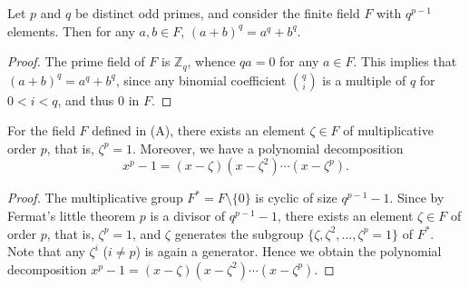 \begin{theorem}[A]
  \label{fact_A}
  \leanok
  Let $p$ and $q$ be distinct odd primes, and consider the finite field $F$ with $q^{p-1}$ elements. Then for any $a, b \in F$, $(a + b)^q = a^q + b^q$.
\end{theorem}
\begin{proof}
  The prime field of $F$ is $\mathbb{Z}_q$, whence $qa = 0$ for any $a \in F$. This implies that $(a + b)^q = a^q + b^q$, since any binomial coefficient $\binom{q}{i}$ is a multiple of $q$ for $0 < i < q$, and thus 0 in $F$.
\end{proof}

\begin{theorem}[B]
  \label{fact_B}
  \leanok
  For the field $F$ defined in (A), there exists an element $\zeta \in F$ of multiplicative order $p$, that is, $\zeta^p = 1$. Moreover, we have a polynomial decomposition
  \[
  x^p - 1 = (x - \zeta) (x - \zeta^2) \cdots (x - \zeta^p).
  \]
\end{theorem}
\begin{proof}
  The multiplicative group $F^* = F \setminus \{0\}$ is cyclic of size $q^{p-1} - 1$. Since by Fermat's little theorem $p$ is a divisor of $q^{p-1} - 1$, there exists an element $\zeta \in F$ of order $p$, that is, $\zeta^p = 1$, and $\zeta$ generates the subgroup $\{\zeta, \zeta^2, \dots, \zeta^p = 1\}$ of $F^*$. Note that any $\zeta^i$ ($i \ne p$) is again a generator. Hence we obtain the polynomial decomposition $x^p - 1 = (x - \zeta) (x - \zeta^2) \cdots (x - \zeta^p)$.
\end{proof}

